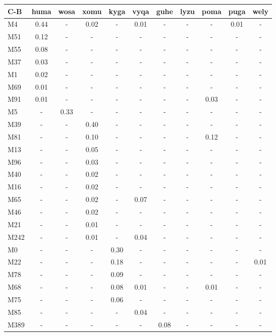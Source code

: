 \begin{table}[h]
\centering
{\footnotesize\begin{tabular}{lcccccccccc}
\lsptoprule
C-B & huma & wosa & xomu & kyga & vyqa & guhe & lyzu & poma & puga & wely\\\midrule
M4 & 0.44 & - & 0.02 & - & 0.01 & - & - & - & 0.01 & -\\\hline
M51 & 0.12 & - & - & - & - & - & - & - & - & -\\\hline
M55 & 0.08 & - & - & - & - & - & - & - & - & -\\\hline
M37 & 0.03 & - & - & - & - & - & - & - & - & -\\\hline
M1 & 0.02 & - & - & - & - & - & - & - & - & -\\\hline
M69 & 0.01 & - & - & - & - & - & - & - & - & -\\\hline
M91 & 0.01 & - & - & - & - & - & - & 0.03 & - & -\\\hline
M5 & - & 0.33 & - & - & - & - & - & - & - & -\\\hline
M39 & - & - & 0.40 & - & - & - & - & - & - & -\\\hline
M81 & - & - & 0.10 & - & - & - & - & 0.12 & - & -\\\hline
M13 & - & - & 0.05 & - & - & - & - & - & - & -\\\hline
M96 & - & - & 0.03 & - & - & - & - & - & - & -\\\hline
M40 & - & - & 0.02 & - & - & - & - & - & - & -\\\hline
M16 & - & - & 0.02 & - & - & - & - & - & - & -\\\hline
M65 & - & - & 0.02 & - & 0.07 & - & - & - & - & -\\\hline
M46 & - & - & 0.02 & - & - & - & - & - & - & -\\\hline
M21 & - & - & 0.01 & - & - & - & - & - & - & -\\\hline
M242 & - & - & 0.01 & - & 0.04 & - & - & - & - & -\\\hline
M0 & - & - & - & 0.30 & - & - & - & - & - & -\\\hline
M22 & - & - & - & 0.18 & - & - & - & - & - & 0.01\\\hline
M78 & - & - & - & 0.09 & - & - & - & - & - & -\\\hline
M68 & - & - & - & 0.08 & 0.01 & - & - & 0.01 & - & -\\\hline
M75 & - & - & - & 0.06 & - & - & - & - & - & -\\\hline
M85 & - & - & - & - & 0.04 & - & - & - & - & -\\\hline
M389 & - & - & - & - & - & 0.08 & - & - & - & -\\\hline

\end{tabular}}
\end{table}
